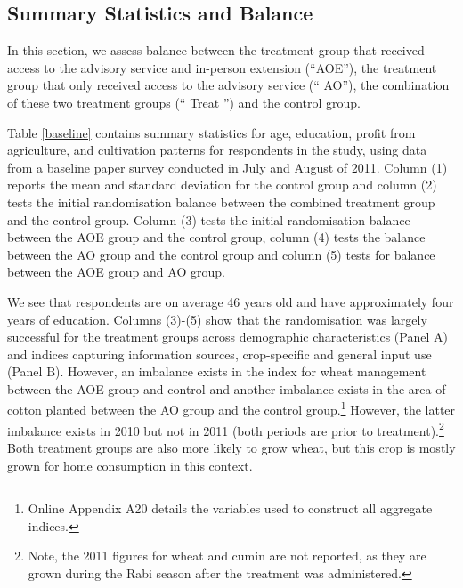 \documentclass[12pt]{article}
\begin{document}
\subsection{\protect\normalsize Summary Statistics and Balance}

{\normalsize In this section, we assess balance between the treatment
group that received access to the advisory service and in-person extension
(\textquotedblleft AOE\textquotedblright ), the treatment group that only
received access to the advisory service (\textquotedblleft
AO\textquotedblright ), the combination of these two treatment groups (\textquotedblleft
Treat \textquotedblright) and the control group.}

{\normalsize Table \ref*{baseline} contains summary statistics for age,
education, profit from agriculture, and cultivation patterns for respondents in the study,
using data from a baseline paper survey conducted in July and August of
2011. Column (1) reports the mean and standard deviation for the control
group and column (2) tests the initial randomisation balance between the combined treatment group and the control group. Column (3) tests the initial randomisation balance between the AOE group and the control group, column (4) tests the balance between the
AO group and the control group and column (5) tests for balance between the AOE group and AO group. }

{\normalsize We see that respondents are on average 46 years old and have
approximately four years of education. Columns (3)-(5) show that the
randomisation was largely successful for the treatment groups across
demographic characteristics (Panel A) and indices capturing information
sources, crop-specific and general input use (Panel B). However, an
imbalance exists in the index for wheat management between the AOE group and control and another imbalance exists in the area of cotton planted between the AO group and the
control group.\footnote{Online Appendix A20 details the variables used to construct all aggregate indices.} However, the latter imbalance exists in 2010 but not in 2011 (both periods
are prior to treatment).\footnote{%
Note, the 2011 figures for wheat and cumin are not reported, as they are
grown during the Rabi season after the treatment was administered.} Both
treatment groups are also more likely to grow wheat, but this crop is mostly
grown for home consumption in this context.}
\end{document}
